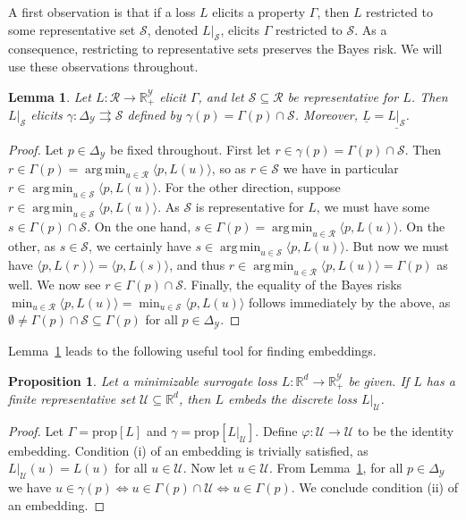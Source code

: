 \documentclass[11pt]{article}
\newcommand{\reals}{\mathbb{R}}
\newcommand{\prop}[1]{\mathrm{prop}[#1]}
\newcommand{\simplex}{\Delta_\Y}
\newcommand{\R}{\mathcal{R}}
\newcommand{\Sc}{\mathcal{S}}
\newcommand{\U}{\mathcal{U}}
\newcommand{\Y}{\mathcal{Y}}
\newcommand{\risk}[1]{\underline{#1}}
\newcommand{\inprod}[2]{\langle #1, #2 \rangle}%
\newcommand{\toto}{\rightrightarrows}
\DeclareMathOperator*{\argmin}{arg\,min}
\newtheorem{lemma}{Lemma}
\newtheorem{proposition}{Proposition}
\begin{document}
A first observation is that if a loss $L$ elicits a property $\Gamma$, then $L$ restricted to some representative set $\Sc$, denoted $L|_\Sc$, elicits $\Gamma$ restricted to $\Sc$.
As a consequence, restricting to representative sets preserves the Bayes risk.
We will use these observations throughout.
\begin{lemma}\label{lem:loss-restrict}
  Let $L:\R\to\reals^\Y_+$ elicit $\Gamma$, and let $\Sc\subseteq\R$ be representative for $L$.
  Then $L|_\Sc$ elicits $\gamma:\simplex\toto\Sc$ defined by $\gamma(p) = \Gamma(p)\cap \Sc$.
  Moreover, $\risk{L}=\risk{L|_\Sc}$.
\end{lemma}
\begin{proof}
  Let $p\in\simplex$ be fixed throughout.
  First let $r \in \gamma(p) = \Gamma(p) \cap \Sc$.
  Then $r \in \Gamma(p) = \argmin_{u\in\R} \inprod{p}{L(u)}$, so as $r\in\Sc$ we have in particular $r \in \argmin_{u\in\Sc} \inprod{p}{L(u)}$.
  For the other direction, suppose $r \in \argmin_{u\in\Sc} \inprod{p}{L(u)}$.
  As $\Sc$ is representative for $L$, we must have some $s \in \Gamma(p) \cap \Sc$.
  On the one hand, $s\in\Gamma(p) = \argmin_{u\in\R} \inprod{p}{L(u)}$.
  On the other, as $s \in \Sc$, we certainly have $s \in \argmin_{u\in\Sc} \inprod{p}{L(u)}$.
  But now we must have $\inprod{p}{L(r)} = \inprod{p}{L(s)}$, and thus $r \in \argmin_{u\in\R} \inprod{p}{L(u)} = \Gamma(p)$ as well.
  We now see $r \in \Gamma(p) \cap \Sc$.
  Finally, the equality of the Bayes risks $\min_{u\in\R} \inprod{p}{L(u)} = \min_{u\in\Sc} \inprod{p}{L(u)}$ follows immediately by the above, as $\emptyset \neq \Gamma(p)\cap\Sc \subseteq \Gamma(p)$ for all $p\in\simplex$.
\end{proof}


Lemma~\ref{lem:loss-restrict} leads to the following useful tool for finding embeddings.
\begin{proposition}\label{prop:representative-embeds-restriction}
  Let a minimizable surrogate loss $L:\reals^d \to \reals^\Y_+$ be given.
  If $L$ has a finite representative set $\U \subseteq \reals^d$, then $L$ embeds the discrete loss $L|_\U$.
\end{proposition}
\begin{proof}
  Let $\Gamma = \prop{L}$ and $\gamma = \prop{L|_\U}$.
  Define $\varphi : \U \to \U$ to be the identity embedding.
  Condition (i) of an embedding is trivially satisfied, as $L|_\U(u) = L(u)$ for all $u\in\U$.
  Now let $u\in\U$.
  From Lemma~\ref{lem:loss-restrict}, for all $p\in\simplex$ we have $u \in \gamma(p) \iff u \in \Gamma(p) \cap \U \iff u \in \Gamma(p)$.
  We conclude condition (ii) of an embedding.
\end{proof}
\end{document}
